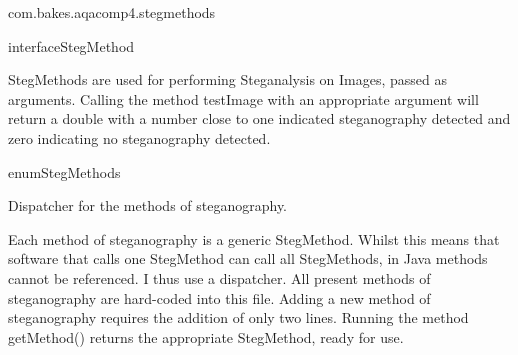 \begin{texdocpackage}{com.bakes.aqacomp4.stegmethods}
\begin{texdocclass}{interface}{StegMethod}
\label{texdoclet:com.bakes.aqacomp4.stegmethods.StegMethod}
\begin{texdocclassintro}
StegMethods are used for performing Steganalysis on Images, passed as arguments.
 Calling the method testImage with an appropriate argument will return a double
 with a number close to one indicated steganography detected and zero indicating no steganography detected.\end{texdocclassintro}
\begin{texdocclassmethods}
\end{texdocclassmethods}
\end{texdocclass}


\begin{texdocclass}{enum}{StegMethods}
\label{texdoclet:com.bakes.aqacomp4.stegmethods.StegMethods}
\begin{texdocclassintro}
Dispatcher for the methods of steganography.
 
 Each method of steganography is a generic StegMethod. Whilst this means that software that calls one StegMethod can call all StegMethods, in Java methods cannot be referenced.
 I thus use a dispatcher. All present methods of steganography are hard-coded into this file. Adding a new method of steganography requires the addition of only two lines.
 Running the method getMethod() returns the appropriate StegMethod, ready for use.\end{texdocclassintro}
\begin{texdocenums}
\end{texdocenums}
\begin{texdocclassmethods}
\end{texdocclassmethods}
\end{texdocclass}


\end{texdocpackage}



